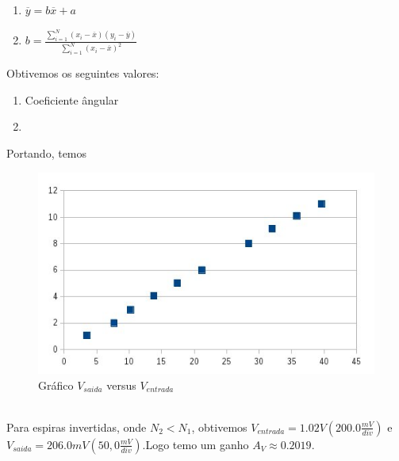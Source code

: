 \documentclass[12pt,letterpaper]{article}
\begin{document}
\begin{enumerate}
\item $\overline{y} = b\overline{x} + a$
\item $b = \frac{\sum_{i=1}^{N}(x_i - \overline{x})(y_i - \overline{y})}{\sum_{i=1}^{N}(x_i - \overline{x})^2}$
\end{enumerate}
Obtivemos os seguintes valores:
\begin{enumerate}
\item Coeficiente ângular
\item {}
\end{enumerate}
Portando, temos 
\begin{figure}[!htb]
  \centering
  \label{itransf}
  \includegraphics[scale=0.45]{img/grafico.jpg}
  \caption{Gráfico $V_{saida}$ versus $V_{entrada}$}
\end{figure}
\\
Para espiras invertidas, onde $N_{2} < N_{1}$, obtivemos $V_{entrada} = 1.02V (200.0\frac{mV}{div})$ e $V_{saida} = 206.0mV (50,0\frac{mV}{div})$.Logo temo um ganho $A_{V} \approx 0.2019$.
\newpage
\end{document}
